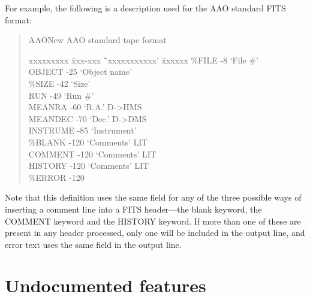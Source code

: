 \begin{itemize}
For example, the following is a description used for the AAO standard FITS
format:
\begin{quote}
\begin{tt}
AAO\hspace{10ex}New AAO standard tape format
\begin{tabbing}
xxxxxxxxx \= xxx-xxx \= `xxxxxxxxxxx' \= xxxxxx \kill
\%FILE    -8     \> `File \#' \\
OBJECT    -25   \> `Object name' \\
\%SIZE    -42   \> `Size' \\
RUN       -49   \> `Run \#' \\
MEANRA    -60   \> `R.A.'        \> D->HMS \\
MEANDEC   -70   \> `Dec.'        \> D->DMS \\
INSTRUME  -85   \> `Instrument' \\
\%BLANK   -120  \> `Comments'    \> LIT \\
COMMENT   -120  \> `Comments'    \> LIT \\
HISTORY   -120  \> `Comments'    \> LIT \\
\%ERROR   -120
\end{tabbing}
\end{tt}
\end{quote}
Note that this definition uses the same field for any of the three possible
ways of inserting a comment line into a FITS header---the blank keyword, the
COMMENT keyword and the HISTORY keyword.  If more than one of these are
present in any header processed, only one will be included in the output
line, and error text uses the same field in the output line.
\end{itemize}

\section{Undocumented features}

